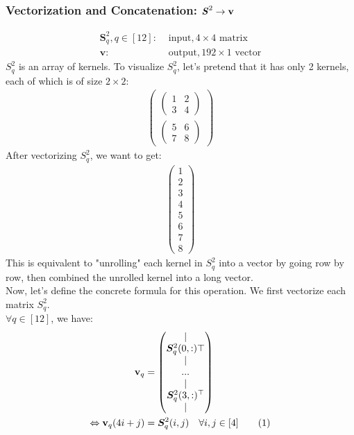 \documentclass[12pt]{article}
\renewcommand{\vec}[1]{\mathbf{#1}}
\newcommand\numberthis{\stepcounter{equation}\tag{\theequation}}
\begin{document}
\subsubsection{Vectorization and Concatenation: $\textbf{\textit{S}}^2 \rightarrow \vec{v}$}
\begin{align*}
    \bm{S}^2_q, q \in [12]:& \text{ input}, 4 \times 4 \text{ matrix}\\
    \vec{v}:& \text{ output}, 192 \times 1 \text{ vector}
\end{align*}
$S^2_q$ is an array of kernels. To visualize $S^2_q$, let's pretend that it has only 2 kernels, each of which is of size $2 \times 2$:
\begin{align*}
    \begin{pmatrix}
        \begin{pmatrix}
        1 & 2\\
        3 & 4
        \end{pmatrix}\\
        \begin{pmatrix}
        5 & 6\\
        7 & 8
        \end{pmatrix}
    \end{pmatrix}
\end{align*}
After vectorizing $S^2_q$, we want to get:
\begin{align*}
    \begin{pmatrix}
        1 \\ 2 \\ 3 \\ 4 \\ 5 \\ 6 \\ 7 \\ 8
    \end{pmatrix}
\end{align*}
This is equivalent to "unrolling" each kernel in $S^2_q$ into a vector by going row by row, then combined the unrolled kernel into a long vector.\\
Now, let's define the concrete formula for this operation. We first vectorize each matrix $S^2_q$.\\
$\forall q \in [12]$, we have:
\begin{align*}
    \vec{v}_q &= \begin{pmatrix} | \\ \bm{S}^2_q(0, :)\top \\ | \\ ... \\ | \\ \bm{S}^2_q(3, :)^\top \\ | \end{pmatrix}\\
    \Leftrightarrow \vec{v}_q(4i + j) &= \bm{S}^2_q(i, j) \quad \forall i, j \in [4]
    \numberthis \label{vectorization}
\end{align*}
\end{document}

